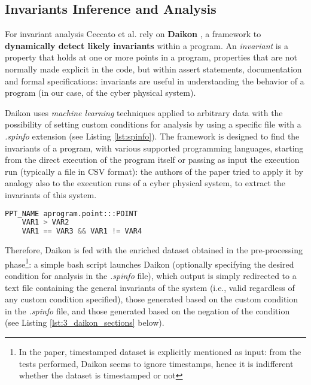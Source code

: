 \subsection{Invariants Inference and Analysis}
\label{subsec:3_ceccato_invariants}
For invariant analysis Ceccato et al. rely on \textbf{Daikon} \cite{daikon_site}, a framework to \textbf{dynamically detect likely invariants} within a program. An \textit{invariant} is a property that holds at one or more points in a program, properties that are not normally made explicit in the code, but within assert statements, documentation and formal specifications: invariants are useful in understanding the behavior of a program (in our case, of the cyber physical system).

Daikon uses \textit{machine learning} techniques applied to arbitrary data with the possibility of setting custom conditions for analysis by using a specific file \cite{daikon_spinfo} with a \textit{.spinfo} extension (see Listing \ref{lst:spinfo}). The framework is designed to find the invariants of a program, with various supported programming languages, starting from the direct execution of the program itself or passing as input the execution run (typically a file in CSV format): the authors of the paper tried to apply it by analogy also to the execution runs of a cyber physical system, to extract the invariants of this system.

\begin{lstlisting}[language=Python,numbers=none,caption={Generic example of a .spinfo file for customizing rules in Daikon},label=lst:spinfo]
	PPT_NAME aprogram.point:::POINT
	VAR1 > VAR2
	VAR1 == VAR3 && VAR1 != VAR4
\end{lstlisting}

Therefore, Daikon is fed with the enriched dataset obtained in the pre-processing phase\footnote{In the paper, timestamped dataset is explicitly mentioned as input: from the tests performed, Daikon seems to ignore timestamps, hence it is indifferent whether the dataset is timestamped or not}: a simple bash script launches Daikon (optionally specifying the desired condition for analysis in the \textit{.spinfo} file), which output is simply redirected to a text file containing the general invariants of the system (i.e., valid regardless of any custom condition specified), those generated based on the custom condition in the \textit{.spinfo} file, and those generated based on the negation of the condition (see Listing \ref{lst:3_daikon_sections} below).

